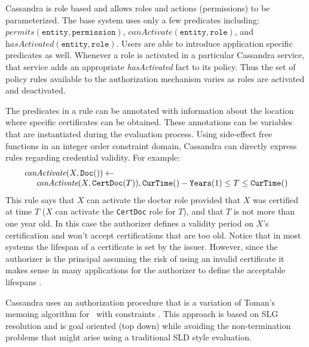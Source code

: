 Cassandra is role based and allows roles and actions (permissions) to be
parameterized. The base system uses only a few predicates including:
$\textit{permits}(\texttt{entity}, \texttt{permission})$,
$\textit{canActivate}(\texttt{entity}, \texttt{role})$, and
$\textit{hasActivated}(\texttt{entity}, \texttt{role})$. Users are able to
introduce application specific predicates as well.
Whenever a role is activated in a particular Cassandra service, that
service adds an appropriate \textit{hasActivated} fact to its policy.
Thus the set of policy rules available to the authorization mechanism varies
as roles are activated and deactivated.

The predicates in a rule can be annotated with information about the
location where specific certificates can be obtained. These annotations
can be variables that are instantiated during the evaluation process.
Using side-effect free functions in an integer order constraint domain,
Cassandra can directly express rules regarding credential validity. For
example:
\begin{displaymath}
\begin{array}{l}
\textit{canActivate}(X, \texttt{Doc}()) \leftarrow \\
\hspace{0.5cm} \textit{canActivate}(X, \texttt{CertDoc}(T)),
  \texttt{CurTime}() - \texttt{Years}(1) \le T \le \texttt{CurTime}()
\end{array}
\end{displaymath}
This rule says that $X$ can activate the doctor role provided that $X$ was
certified at time $T$ ($X$ can activate the \texttt{CertDoc} role for $T$),
and that $T$ is not more than one year old. In this case the authorizer
defines a validity period on $X$'s certification and won't accept
certifications that are too old. Notice that in most systems the lifespan
of a certificate is set by the issuer. However, since the authorizer is the
principal assuming the risk of using an invalid certificate it makes sense
in many applications for the authorizer to define the acceptable lifespans
\cite{Rivest:CWECRL}.

Cassandra uses an authorization procedure that is a variation of
Toman's memoing algorithm for \datalog\ with constraints
\cite{Toman:MECED}. This approach is based on SLG resolution and is
goal oriented (top down) while avoiding the non-termination problems
that might arise using a traditional SLD style evaluation.

